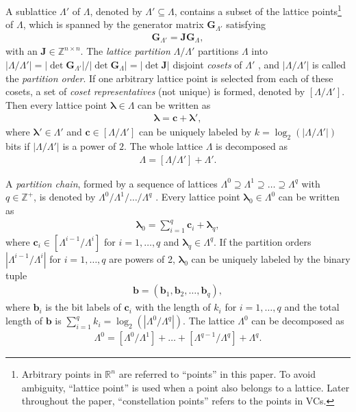 \documentclass[journal]{IEEEtran}
\newcommand{\R}{\mathbb{R}}
\newcommand{\Z}{\mathbb{Z}}
\newcommand{\bb}{\boldsymbol{b}}
\newcommand{\bc}{\boldsymbol{c}}
\newcommand{\bG}{\boldsymbol{G}}
\newcommand{\bJ}{\boldsymbol{J}}
\newcommand{\blambda}{\boldsymbol{\lambda}}
\begin{document}
A sublattice $\Lambda'$ of $\Lambda$, denoted by $\Lambda' \subseteq \Lambda$, contains a subset of the lattice points\footnote{Arbitrary points in $\R^n$ are referred to ``points'' in this paper. To avoid ambiguity, ``lattice point'' is used when a point also belongs to a lattice. Later throughout the paper, ``constellation points'' refers to the points in VCs.} of $\Lambda$, which is spanned by the generator matrix $\bG_{\Lambda'}$ satisfying
\begin{align}
\bG_{\Lambda'}=\bJ\bG_{\Lambda},
\end{align}
with an $ \bJ \in \Z^{n\times n}$. The \emph{lattice partition} $
\Lambda/\Lambda'$ partitions $\Lambda$ into $|\Lambda/\Lambda'|=|\!\det\bG_{\Lambda'}|/|\!\det\bG_{\Lambda}|=|\!\det\bJ|$ disjoint \emph{cosets} of $\Lambda'$ \cite{calderbank87}, and $|\Lambda/\Lambda'|$ is called the \emph{partition order}. If one arbitrary lattice point is selected from each of these cosets, a set of \emph{coset representatives} (not unique) is formed, denoted by $[\Lambda/\Lambda']$. Then every lattice point $\blambda \in\Lambda$ can be written as 
\begin{align}
    \blambda=\bc+\blambda',
\end{align}
where $\blambda' \in \Lambda'$ and $\bc\in[\Lambda/\Lambda']$ can be uniquely labeled by $k=\log_2(|\Lambda/\Lambda'|)$ bits if $|\Lambda/\Lambda'|$ is a power of $2$. The whole lattice $\Lambda$ is decomposed as
\begin{align}
    \Lambda=[\Lambda/\Lambda']+\Lambda'.
\end{align}

A \emph{partition chain}, formed by a sequence of lattices ${\Lambda^{0}\supseteq\Lambda^{1}\supseteq\dots\supseteq\Lambda^{q}}$ with $q\in\Z^+$, is denoted by $\Lambda^{0}/\Lambda^{1}/\dots/\Lambda^{q}$ \cite{forney89a}. Every lattice point $\blambda_0\in\Lambda^0$ can be written as 
\begin{align}
    \blambda_0=\sum_{i=1}^q\bc_i+\blambda_q,
\end{align}
where $\bc_i \in [\Lambda^{i-1}/\Lambda^i]$ for $i=1,\ldots,q$ and $\blambda_q \in \Lambda^q$. If the partition orders $|\Lambda^{i-1}/\Lambda^{i}|$ for $i=1,\ldots,q$ are powers of 2, $\blambda_0$ can be uniquely labeled by the binary tuple
\begin{align}
    \bb=(\bb_1,\bb_2,\ldots,\bb_q),
\end{align}
where $\bb_i$ is the bit labels of $\bc_i$ with the length of $k_i$ for $i=1,\ldots,q$ and the total length of $\bb$ is ${\sum_{i=1}^{q}k_i=\log_2(|\Lambda^0/\Lambda^q|)}$. The lattice $\Lambda^0$ can be decomposed as
\begin{align}
    \Lambda^0=[\Lambda^0/\Lambda^1]+\dots+[\Lambda^{q-1}/\Lambda^q]+\Lambda^q.
\end{align}
\end{document}
